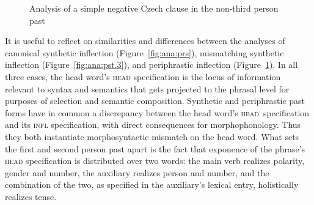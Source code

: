 \documentclass[output=paper]{langsci/langscibook}
\begin{document}
\begin{figure}
\caption{Analysis of a simple negative Czech clause in the non-third person past\label{fig:ana:pst}}
\end{figure}

It is useful to reflect on similarities and differences between the analyses of canonical synthetic inflection (Figure~\ref{fig:ana:prs}), mismatching synthetic inflection (Figure~\ref{fig:ana:pst.3}), and periphrastic inflection (Figure~\ref{fig:ana:pst}). In all three cases, the head word's \textsc{head} specification is the locus of information relevant to syntax and semantics that gets projected to the phrasal level for purposes of selection and semantic composition. Synthetic and periphrastic past forms have in common a discrepancy between the head word's \textsc{head} speci\-fication and its \textsc{infl} specification, with direct consequences for morphophonology. Thus they both instantiate morphosyntactic mismatch on the head word. What sets the first and second person past apart is the fact that exponence of the phrase's \textsc{head} specification is distributed \citep{Ackerman04} over two words: the main verb realizes polarity, gender and number, the auxiliary realizes person and number, and the combination of the two, as specified in the auxiliary's lexical entry, holistically realizes tense.
\end{document}
